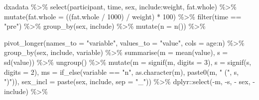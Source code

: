 \documentclass[
  11pt,
  letterpaper,
]{scrbook}
\newenvironment{Shaded}{\begin{snugshade}}{\end{snugshade}}
\newcommand{\AttributeTok}[1]{\textcolor[rgb]{0.40,0.45,0.13}{#1}}
\newcommand{\DecValTok}[1]{\textcolor[rgb]{0.68,0.00,0.00}{#1}}
\newcommand{\FunctionTok}[1]{\textcolor[rgb]{0.28,0.35,0.67}{#1}}
\newcommand{\NormalTok}[1]{\textcolor[rgb]{0.00,0.23,0.31}{#1}}
\newcommand{\SpecialCharTok}[1]{\textcolor[rgb]{0.37,0.37,0.37}{#1}}
\newcommand{\StringTok}[1]{\textcolor[rgb]{0.13,0.47,0.30}{#1}}
\begin{document}
\begin{Shaded}
\begin{Highlighting}[numbers=left,,]
\NormalTok{dxadata }\SpecialCharTok{\%\textgreater{}\%}
  \FunctionTok{select}\NormalTok{(participant, time, sex, include}\SpecialCharTok{:}\NormalTok{weight, fat.whole) }\SpecialCharTok{\%\textgreater{}\%}
  \FunctionTok{mutate}\NormalTok{(}\AttributeTok{fat.whole =}\NormalTok{ ((fat.whole }\SpecialCharTok{/} \DecValTok{1000}\NormalTok{) }\SpecialCharTok{/}\NormalTok{ weight) }\SpecialCharTok{*} \DecValTok{100}\NormalTok{) }\SpecialCharTok{\%\textgreater{}\%}
  \FunctionTok{filter}\NormalTok{(time }\SpecialCharTok{==} \StringTok{"pre"}\NormalTok{) }\SpecialCharTok{\%\textgreater{}\%}
  \FunctionTok{group\_by}\NormalTok{(sex, include) }\SpecialCharTok{\%\textgreater{}\%}
  \FunctionTok{mutate}\NormalTok{(}\AttributeTok{n =} \FunctionTok{n}\NormalTok{()) }\SpecialCharTok{\%\textgreater{}\%}

  \FunctionTok{pivot\_longer}\NormalTok{(}\AttributeTok{names\_to =}  \StringTok{"variable"}\NormalTok{, }
               \AttributeTok{values\_to =} \StringTok{"value"}\NormalTok{, }
               \AttributeTok{cols =}\NormalTok{ age}\SpecialCharTok{:}\NormalTok{n) }\SpecialCharTok{\%\textgreater{}\%}
  \FunctionTok{group\_by}\NormalTok{(sex, include, variable) }\SpecialCharTok{\%\textgreater{}\%}
  \FunctionTok{summarise}\NormalTok{(}\AttributeTok{m =} \FunctionTok{mean}\NormalTok{(value), }
            \AttributeTok{s =} \FunctionTok{sd}\NormalTok{(value)) }\SpecialCharTok{\%\textgreater{}\%}
  \FunctionTok{ungroup}\NormalTok{() }\SpecialCharTok{\%\textgreater{}\%}
  \FunctionTok{mutate}\NormalTok{(}\AttributeTok{m =} \FunctionTok{signif}\NormalTok{(m, }\AttributeTok{digits =} \DecValTok{3}\NormalTok{), }
         \AttributeTok{s =} \FunctionTok{signif}\NormalTok{(s, }\AttributeTok{digits =} \DecValTok{2}\NormalTok{), }
         \AttributeTok{ms =} \FunctionTok{if\_else}\NormalTok{(variable }\SpecialCharTok{==} \StringTok{"n"}\NormalTok{, }\FunctionTok{as.character}\NormalTok{(m), }\FunctionTok{paste0}\NormalTok{(m, }\StringTok{" ("}\NormalTok{, s, }\StringTok{")"}\NormalTok{)), }
         \AttributeTok{sex\_incl =} \FunctionTok{paste}\NormalTok{(sex, include, }\AttributeTok{sep =} \StringTok{"\_"}\NormalTok{)) }\SpecialCharTok{\%\textgreater{}\%}
\NormalTok{  dplyr}\SpecialCharTok{::}\FunctionTok{select}\NormalTok{(}\SpecialCharTok{{-}}\NormalTok{m, }\SpecialCharTok{{-}}\NormalTok{s, }\SpecialCharTok{{-}}\NormalTok{ sex, }\SpecialCharTok{{-}}\NormalTok{include) }\SpecialCharTok{\%\textgreater{}\%}


\end{Highlighting}
\end{Shaded}
\end{document}
